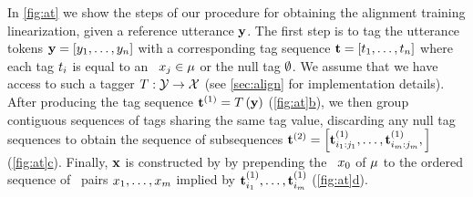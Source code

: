 In \autoref{fig:at} we show the steps of our procedure for obtaining
the alignment training linearization, given a reference utterance $\mathbf{y}$.
The first step is 
to tag the utterance tokens 
$\mathbf{y} = \left[y_1,\ldots,y_n\right]$ 
with a corresponding tag sequence 
$\mathbf{t}=\left[t_1,\ldots, t_n\right]$ where each 
tag $t_i$ is equal to an \attributevalue~$x_j \in \mu$ or 
the null tag $\emptyset$. We assume that we have access to such a tagger
$T : \mathcal{Y} \rightarrow \mathcal{X}$ (see \autoref{sec:align}
for implementation details). After producing the tag sequence $\mathbf{t}^{(1)} = T\left(\mathbf{y}\right)$ 
(\hyperref[fig:at]{\autoref{fig:at}b}),
we then group contiguous sequences of tags sharing the same tag value, discarding any null tag sequences to obtain the sequence of subsequences 
$\mathbf{t}^{(2)} = \left[\mathbf{t}^{(1)}_{i_1:j_1},\ldots,\mathbf{t}^{(1)}_{i_{m}:j_{m}}, \right]$ (\hyperref[fig:at]{\autoref{fig:at}c}).
Finally, $\mathbf{x}$ is constructed by 
by prepending the \dialogueact~$x_0$ of $\mu$ to the ordered sequence 
of \attributevalue~pairs $x_1,\ldots,x_{m}$ implied by $\mathbf{t}^{(1)}_{i_1},\ldots,\mathbf{t}^{(1)}_{i_{m}}$ (\hyperref[fig:at]{\autoref{fig:at}d}). 



%


